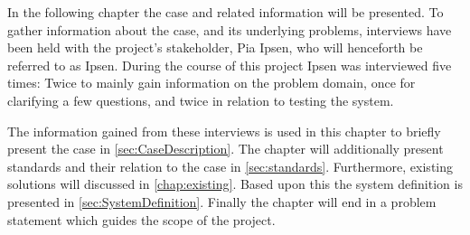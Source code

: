 In the following chapter the case and related information will be presented.
To gather information about the case, and its underlying problems, interviews have been held with the project's stakeholder, Pia Ipsen, who will henceforth be referred to as Ipsen. 
During the course of this project Ipsen was interviewed five times: 
Twice to mainly gain information on the problem domain, 
once for clarifying a few questions, 
and twice in relation to testing the system. 

The information gained from these interviews is used in this chapter to briefly present the case in \cref{sec:CaseDescription}. 
The chapter will additionally present standards and their relation to the case in \cref{sec:standards}.
Furthermore, existing solutions will discussed in \cref{chap:existing}.
Based upon this the system definition is presented in \cref{sec:SystemDefinition}.
Finally the chapter will end in a problem statement which guides the scope of the project.

